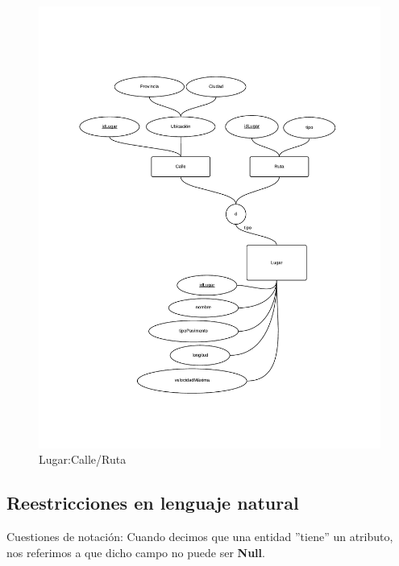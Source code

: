 \newpage
\begin{figure}
  \begin{center}
    \includegraphics[scale=0.6]{diagramas/2-3.pdf}
    \caption{Lugar:Calle/Ruta}
  \end{center}
\end{figure}

\newpage
\subsection{Reestricciones en lenguaje natural}

Cuestiones de notación: Cuando decimos que una entidad ''tiene'' un atributo, nos referimos a que dicho campo no puede ser \textbf{Null}.

